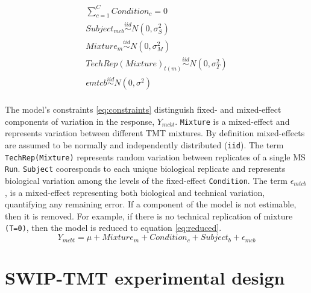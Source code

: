 \documentclass[11pt]{elife}\usepackage[]{graphicx}\usepackage[]{color}
\begin{document}
\begin{equation}
  \begin{gathered}
    \label{eq:constraints}
	\sum_{c=1}^{C} Condition_c = 0 \\
	Subject_{mcb} \stackrel{iid}{\sim} N(0,\sigma^2_S) \\
	Mixture_m \stackrel{iid}{\sim} N(0,\sigma^2_M) \\
	TechRep(Mixture)_{t(m)} \stackrel{iid}{\sim} N(0,\sigma^2_T) \\
	\epsilon{mtcb} \stackrel{iid}{\sim} N(0,\sigma^2) \\
  \end{gathered}
\end{equation}

The model's constraints \ref{eq:constraints} distinguish fixed- and mixed-effect
components of variation in the response, $Y_{mcbt}$. \texttt{Mixture} is a
mixed-effect and represents variation between different TMT mixtures. By definition
mixed-effects are assumed to be normally and independently distributed (\texttt{iid}). 
The term \texttt{TechRep(Mixture)} represents random variation between
replicates of a single MS \texttt{Run}. \texttt{Subject} cooresponds
to each unique biological replicate and represents biological variation among
the levels of the fixed-effect \texttt{Condition}. The term
$\epsilon_{mtcb}$, is a mixed-effect representing both biological and technical
variation, quantifying any remaining error. If a component of the model is not
estimable, then it is removed.  For example, if there is no technical
replication of mixture \texttt{(T=0)}, 
then the model is reduced to equation \ref{eq:reduced}.
\begin{equation} %
	\label{eq:reduced} %
	Y_{mcbt} = \mu + Mixture_m + Condition_c + Subject_b + \epsilon_{mcb}
\end{equation}


\section{SWIP-TMT experimental design}
\end{document}

